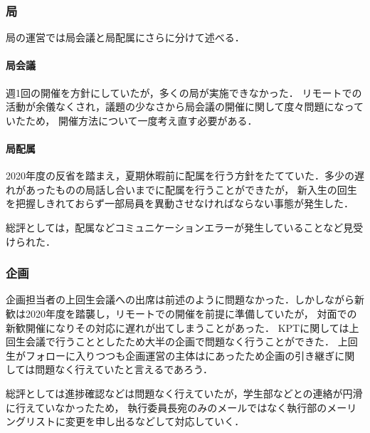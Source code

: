 \subsubsection*{局}
局の運営では局会議と局配属にさらに分けて述べる．
\paragraph*{局会議}
週1回の開催を方針にしていたが，多くの局が実施できなかった．
リモートでの活動が余儀なくされ，議題の少なさから局会議の開催に関して度々問題になっていたため，
開催方法について一度考え直す必要がある．
\paragraph*{局配属}
2020年度の反省を踏まえ，夏期休暇前に配属を行う方針をたてていた．多少の遅れがあったものの局話し合いまでに配属を行うことができたが，
新入生の回生を把握しきれておらず一部局員を異動させなければならない事態が発生した．

総評としては，配属などコミュニケーションエラーが発生していることなど見受けられた．

\subsubsection*{企画}
企画担当者の上回生会議への出席は前述のように問題なかった．しかしながら新歓は2020年度を踏襲し，リモートでの開催を前提に準備していたが，
対面での新歓開催になりその対応に遅れが出てしまうことがあった．
KPTに関しては上回生会議で行うこととしたため大半の企画で問題なく行うことができた．
上回生がフォローに入りつつも企画運営の主体は\secondGrade{}にあったため企画の引き継ぎに関しては問題なく行えていたと言えるであろう．

総評としては進捗確認などは問題なく行えていたが，学生部などとの連絡が円滑に行えていなかったため，
執行委員長宛のみのメールではなく執行部のメーリングリストに変更を申し出るなどして対応していく．
